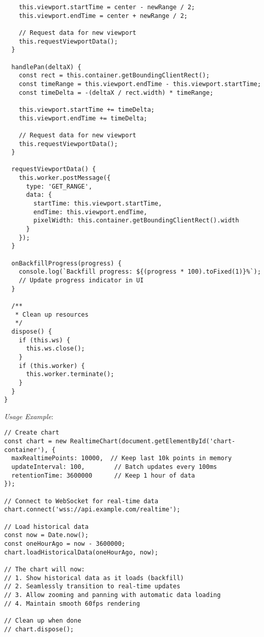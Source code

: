 \documentclass[11pt]{article}
\begin{document}
\begin{verbatim}
    this.viewport.startTime = center - newRange / 2;
    this.viewport.endTime = center + newRange / 2;
    
    // Request data for new viewport
    this.requestViewportData();
  }
  
  handlePan(deltaX) {
    const rect = this.container.getBoundingClientRect();
    const timeRange = this.viewport.endTime - this.viewport.startTime;
    const timeDelta = -(deltaX / rect.width) * timeRange;
    
    this.viewport.startTime += timeDelta;
    this.viewport.endTime += timeDelta;
    
    // Request data for new viewport
    this.requestViewportData();
  }
  
  requestViewportData() {
    this.worker.postMessage({
      type: 'GET_RANGE',
      data: {
        startTime: this.viewport.startTime,
        endTime: this.viewport.endTime,
        pixelWidth: this.container.getBoundingClientRect().width
      }
    });
  }
  
  onBackfillProgress(progress) {
    console.log(`Backfill progress: ${(progress * 100).toFixed(1)}%`);
    // Update progress indicator in UI
  }
  
  /**
   * Clean up resources
   */
  dispose() {
    if (this.ws) {
      this.ws.close();
    }
    if (this.worker) {
      this.worker.terminate();
    }
  }
}
\end{verbatim}

\emph{Usage Example}:

\begin{verbatim}
// Create chart
const chart = new RealtimeChart(document.getElementById('chart-container'), {
  maxRealtimePoints: 10000,  // Keep last 10k points in memory
  updateInterval: 100,        // Batch updates every 100ms
  retentionTime: 3600000      // Keep 1 hour of data
});

// Connect to WebSocket for real-time data
chart.connect('wss://api.example.com/realtime');

// Load historical data
const now = Date.now();
const oneHourAgo = now - 3600000;
chart.loadHistoricalData(oneHourAgo, now);

// The chart will now:
// 1. Show historical data as it loads (backfill)
// 2. Seamlessly transition to real-time updates
// 3. Allow zooming and panning with automatic data loading
// 4. Maintain smooth 60fps rendering

// Clean up when done
// chart.dispose();
\end{verbatim}
\end{document}
